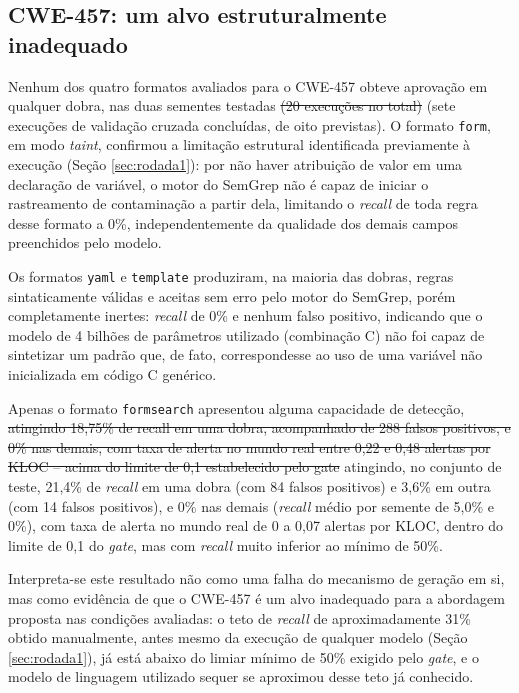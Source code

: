 \documentclass[
    12pt,                %
    openright,           %
    oneside,             %
    a4paper,             %
    english,             %
    brazil               %
]{abntex2}
\newcommand{\antigo}[1]{\sout{#1}}
\newcommand{\novo}[1]{{\color{red}#1}}
\begin{document}
\subsection{CWE-457: um alvo estruturalmente inadequado}
\label{sec:resultadoscwe457}
\par
Nenhum dos quatro formatos avaliados para o CWE-457 obteve aprovação em qualquer dobra, nas duas sementes testadas \antigo{(20 execuções no total)} \novo{(sete execuções de validação cruzada concluídas, de oito previstas)}.
O formato \texttt{form}, em modo \textit{taint}, confirmou a limitação estrutural identificada previamente à execução (Seção \ref{sec:rodada1}): por não haver atribuição de valor em uma declaração de variável, o motor do SemGrep não é capaz de iniciar o rastreamento de contaminação a partir dela, limitando o \textit{recall} de toda regra desse formato a 0\%, independentemente da qualidade dos demais campos preenchidos pelo modelo.
\par
Os formatos \texttt{yaml} e \texttt{template} produziram, na maioria das dobras, regras sintaticamente válidas e aceitas sem erro pelo motor do SemGrep, porém completamente inertes: \textit{recall} de 0\% e nenhum falso positivo, indicando que o modelo de 4 bilhões de parâmetros utilizado (combinação C) não foi capaz de sintetizar um padrão que, de fato, correspondesse ao uso de uma variável não inicializada em código C genérico.
\par
Apenas o formato \texttt{formsearch} apresentou alguma capacidade de detecção, \antigo{atingindo 18,75\% de recall em uma dobra, acompanhado de 288 falsos positivos, e 0\% nas demais, com taxa de alerta no mundo real entre 0,22 e 0,48 alertas por KLOC -- acima do limite de 0,1 estabelecido pelo gate} \novo{atingindo, no conjunto de teste, 21,4\% de \textit{recall} em uma dobra (com 84 falsos positivos) e 3,6\% em outra (com 14 falsos positivos), e 0\% nas demais (\textit{recall} médio por semente de 5,0\% e 0\%), com taxa de alerta no mundo real de 0 a 0,07 alertas por KLOC, dentro do limite de 0,1 do \textit{gate}, mas com \textit{recall} muito inferior ao mínimo de 50\%}.
\par
Interpreta-se este resultado não como uma falha do mecanismo de geração em si, mas como evidência de que o CWE-457 é um alvo inadequado para a abordagem proposta nas condições avaliadas: o teto de \textit{recall} de aproximadamente 31\% obtido manualmente, antes mesmo da execução de qualquer modelo (Seção \ref{sec:rodada1}), já está abaixo do limiar mínimo de 50\% exigido pelo \textit{gate}, e o modelo de linguagem utilizado sequer se aproximou desse teto já conhecido.
\end{document}
